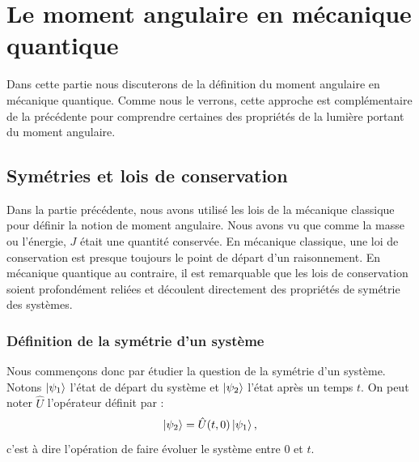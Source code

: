 \section{Le moment angulaire en mécanique quantique}
Dans cette partie nous discuterons de la définition du moment angulaire en mécanique quantique. Comme nous le verrons, cette approche est complémentaire de la précédente pour comprendre certaines des propriétés de la lumière portant du moment angulaire. 

\subsection{Symétries et lois de conservation}

Dans la partie précédente, nous avons utilisé les lois de la mécanique classique pour définir la notion de moment angulaire. Nous avons vu que comme la masse ou l'énergie, $J$ était une quantité conservée. En mécanique classique, une loi de conservation est presque toujours le point de départ d'un raisonnement. En mécanique quantique au contraire, il est remarquable que les lois de conservation soient profondément reliées et découlent directement des propriétés de symétrie des systèmes. 

\subsubsection{Définition de la symétrie d'un système}
Nous commençons donc par étudier la question de la symétrie d'un système. Notons $\ket{\psi_1}$ l'état de départ du système et $\ket{\psi_2}$ l'état après un temps $t$. On peut noter $\hat{U}$ l'opérateur définit par :
\begin{equation*}
\ket{\psi_2}=\hat{U}(t,0)\ket{\psi_1},
\end{equation*}
c'est à dire l'opération de faire évoluer le système entre 0 et $t$.

